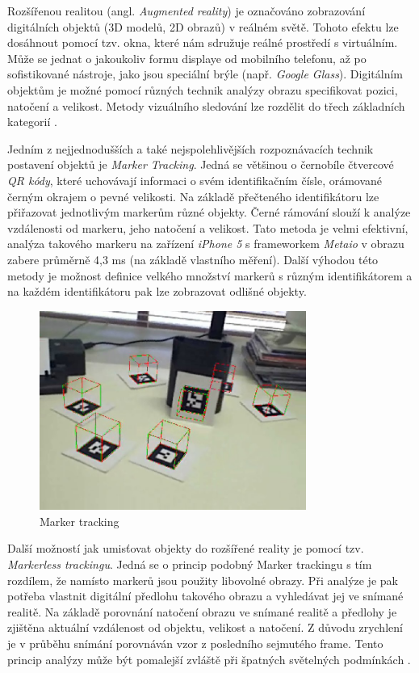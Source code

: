\documentclass[twoside,12pt]{article}
\begin{document}
%
%

Rozšířenou realitou (angl. \textit{Augmented reality}) je označováno zobrazování digitálních objektů (3D modelů, 2D obrazů) v reálném světě. Tohoto efektu lze dosáhnout pomocí tzv. okna, které nám sdružuje reálné prostředí s virtuálním. Může se jednat o jakoukoliv formu displaye od mobilního telefonu, až po sofistikované nástroje, jako jsou speciální brýle (např. \textit{Google Glass}). Digitálním objektům je možné pomocí různých technik analýzy obrazu specifikovat pozici, natočení a velikost. Metody vizuálního sledování lze rozdělit do třech základních kategorií \cite{klein_visual_tracking}.

Jedním z nejjednodušších a také nejspolehlivějších rozpoznávacích technik postavení objektů je \textit{Marker Tracking}. Jedná se většinou o černobíle čtvercové \textit{QR kódy}, které uchovávají informaci o svém identifikačním čísle, orámované černým okrajem o pevné velikosti. Na základě přečteného identifikátoru lze přiřazovat jednotlivým markerům různé objekty. Černé rámování slouží k analýze vzdálenosti od markeru, jeho natočení a velikost. Tato metoda je velmi efektivní, analýza takového markeru na zařízení \textit{iPhone 5} s frameworkem \textit{Metaio} v obrazu zabere průměrně 4,3 ms (na základě vlastního měření). Další výhodou této metody je možnost definice velkého množství markerů s různým identifikátorem a na každém identifikátoru pak lze zobrazovat odlišné objekty.

\begin{figure}[H]
    \includegraphics[width=330px, center]{images/marker-tracking.jpg}
    \caption{Marker tracking}
    \label{marker_tracking}
\end{figure}

Další možností jak umisťovat objekty do rozšířené reality je pomocí tzv. \textit{Markerless trackingu}. Jedná se o princip podobný Marker trackingu s tím rozdílem, že namísto markerů jsou použity libovolné obrazy. Při analýze je pak potřeba vlastnit digitální předlohu takového obrazu a vyhledávat jej ve snímané realitě. Na základě porovnání natočení obrazu ve snímané realitě a předlohy je zjištěna aktuální vzdálenost od objektu, velikost a natočení. Z důvodu zrychlení je v průběhu snímání porovnáván vzor z posledního sejmutého frame. Tento princip analýzy může být pomalejší zvláště při špatných světelných podmínkách \cite{handbook_of_ar}.
\end{document}
